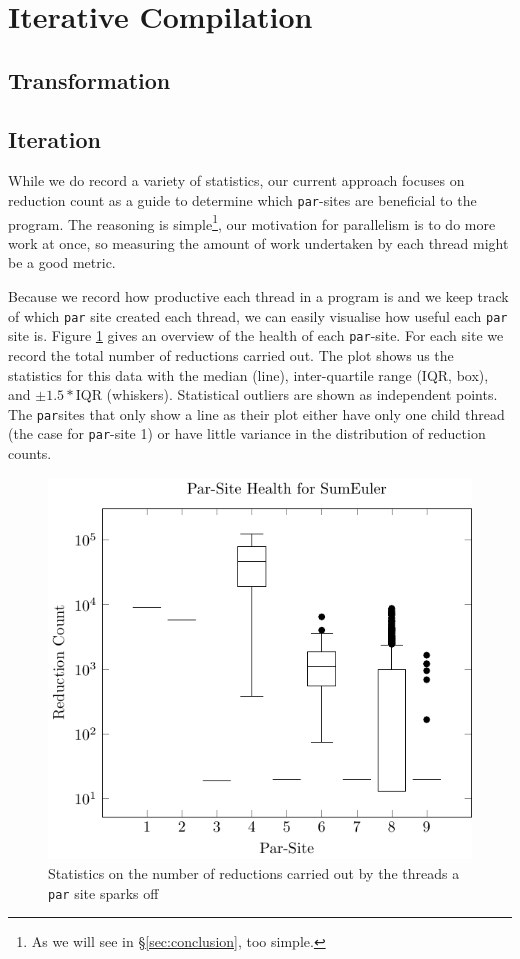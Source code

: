 %
%
\section{Iterative Compilation}
\label{sec:iterate}


\subsection*{Transformation}

\subsection*{Iteration}

While we do record a variety of statistics, our current approach focuses on reduction
count as a guide to determine which \verb-par--sites are beneficial to the program.
The reasoning is simple\footnote{As we will see in \S \ref{sec:conclusion}, too simple.},
our motivation for parallelism is to do more work at once, so measuring the amount
of work undertaken by each thread might be a good metric.

Because we record how productive each thread in a program is and we keep track
of which \verb-par- site created each thread, we can easily visualise how useful
each \verb-par- site is. Figure \ref{sumHist} gives an overview of the health
of each \verb-par--site. For each site we record the total number of reductions
carried out. The plot shows us the statistics for this data with the median
(line), inter-quartile range (IQR, box), and $\pm1.5 * $IQR (whiskers).
Statistical outliers are shown as independent points. The \verb-par-sites that
only show a line as their plot either have only one child thread (the case for
\verb-par--site 1) or have little variance in the distribution of reduction
counts.

\begin{figure}
  \includegraphics[width=\linewidth]{Informed/Figures/threadhealth.pdf}
\caption{Statistics on the number of reductions carried out by the threads a
\texttt{par} site sparks off}
\label{sumHist}
\end{figure}


